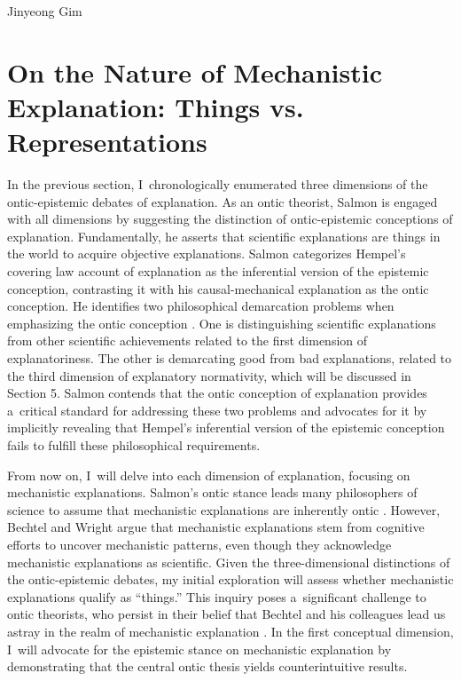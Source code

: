 \begin{artengenv}{Jinyeong Gim}
\section{On the Nature of Mechanistic Explanation: Things vs. Representations}
In the previous section, I~chronologically enumerated three dimensions of the ontic-epistemic debates of explanation. As an ontic theorist, Salmon is engaged with all dimensions by suggesting the distinction of ontic-epistemic conceptions of explanation. Fundamentally, he asserts that scientific explanations are things in the world to acquire objective explanations. Salmon categorizes Hempel's covering law account of explanation as the inferential version of the epistemic conception, contrasting it with his causal-mechanical explanation as the ontic conception. He identifies two philosophical demarcation problems when emphasizing the ontic conception
\parencite[see][]{salmon_scientific_1984}. %
 One is distinguishing scientific explanations from other scientific achievements related to the first dimension of explanatoriness. The other is demarcating good from bad explanations, related to the third dimension of explanatory normativity, which will be discussed in Section 5. Salmon contends that the ontic conception of explanation provides a~critical standard for addressing these two problems and advocates for it by implicitly revealing that Hempel's inferential version of the epistemic conception fails to fulfill these philosophical requirements.

From now on, I~will delve into each dimension of explanation, focusing on mechanistic explanations. Salmon's ontic stance leads many philosophers of science to assume that mechanistic explanations are inherently ontic
\parencites[see][]{craver_explaining_2007}[][]{kaplan_explanatory_2011}[][]{povich_minimal_2018}. %
 However, Bechtel and Wright argue that mechanistic explanations stem from cognitive efforts to uncover mechanistic patterns, even though they acknowledge mechanistic explanations as scientific. Given the three-dimensional distinctions of the ontic-epistemic debates, my initial exploration will assess whether mechanistic explanations qualify as ``things.'' This inquiry poses a~significant challenge to ontic theorists, who persist in their belief that Bechtel and his colleagues lead us astray in the realm of mechanistic explanation 
\parencite[see][]{kaiser_ontic_2014}. %
 In the first conceptual dimension, I~will advocate for the epistemic stance on mechanistic explanation by demonstrating that the central ontic thesis yields counterintuitive results.


\end{artengenv}
